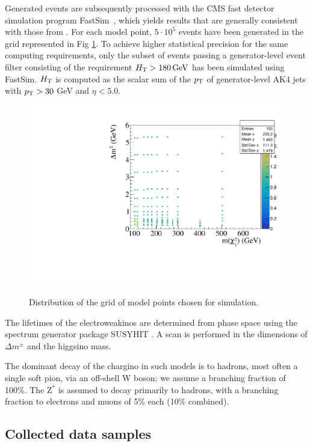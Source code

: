 Generated events are subsequently processed with the CMS fast detector
simulation program FastSim~\cite{Abdullin:2011zz,Giammanco:2014bza},
which yields results that are generally consistent with those from {\GEANTfour}. For each model point,  $5\cdot 10^5$ events have been generated in the grid represented in Fig \ref{fig:signal-scan-grid}. To achieve higher statistical precision for the same computing requirements, only the subset of events passing a generator-level event filter consisting of the requirement $H_{\mathrm{T}}>180 \,\text{Ge\hspace{-.08em}V}$ has been simulated using FastSim. $H_{\mathrm{T}}$ is computed as the scalar sum of the $p_{\mathrm{T}}$ of generator-level AK4 jets with $p_{\mathrm{T}}>30$ GeV and $\eta<5.0$.

\begin{figure}[!htb]
\centering
\includegraphics[width=0.80\linewidth]{plots/signal_scan/PureHiggsinoScan.pdf} \\
\caption[Distribution of the grid of model points chosen for simulation]{Distribution of the grid of model points chosen for simulation.}
\label{fig:signal-scan-grid}
\end{figure}

The lifetimes of the electroweakinos are determined from phase space using the spectrum generator package SUSYHIT \cite{Allanach:2001kg}. A scan is performed in the dimensions of $\Delta m^{\pm}$ and the higgsino mass.

The dominant decay of the chargino in such models is to hadrons, most often a single soft pion, via an off-shell W boson; we assume a branching fraction of 100\%. The Z$^{*}$ is assumed to decay primarily to hadrons, with a branching fraction to electrons and muons of 5\% each (10\% combined).



\subsection{Collected data samples}
\label{sec:data-samples}


